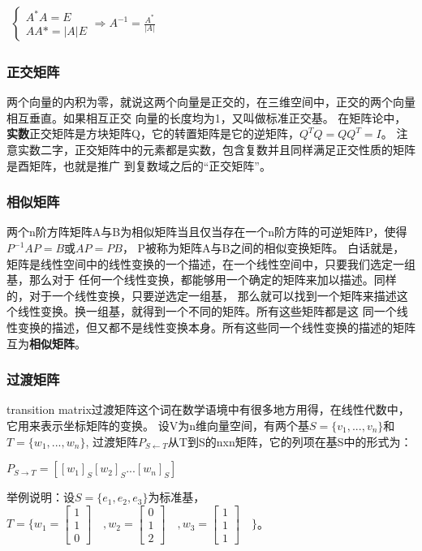 \begin{math}
    \begin{aligned}
\begin{cases} A^*A=E\\ AA*=|A|E \end{cases} \Rightarrow A^{-1}=\frac{A^*}{|A|}
\end{aligned}
\end{math}


\subsubsection{正交矩阵}
两个向量的内积为零，就说这两个向量是正交的，在三维空间中，正交的两个向量相互垂直。如果相互正交
向量的长度均为1，又叫做标准正交基。
在矩阵论中，\textbf{实数}正交矩阵是方块矩阵Q，它的转置矩阵是它的逆矩阵，$Q^TQ=QQ^T=I$。
注意实数二字，正交矩阵中的元素都是实数，包含复数并且同样满足正交性质的矩阵是酉矩阵，也就是推广
到复数域之后的“正交矩阵”。

\subsubsection{相似矩阵}
两个n阶方阵矩阵A与B为相似矩阵当且仅当存在一个n阶方阵的可逆矩阵P，使得$P^{-1}AP=B$或$AP=PB$，
P被称为矩阵A与B之间的相似变换矩阵。
白话就是，矩阵是线性空间中的线性变换的一个描述，在一个线性空间中，只要我们选定一组基，那么对于
任何一个线性变换，都能够用一个确定的矩阵来加以描述。同样的，对于一个线性变换，只要逆选定一组基，
那么就可以找到一个矩阵来描述这个线性变换。换一组基，就得到一个不同的矩阵。所有这些矩阵都是这
同一个线性变换的描述，但又都不是线性变换本身。所有这些同一个线性变换的描述的矩阵互为\textbf{相似矩阵}。

\subsubsection{过渡矩阵}
transition matrix过渡矩阵这个词在数学语境中有很多地方用得，在线性代数中，它用来表示坐标矩阵的变换。
\newline
设V为n维向量空间，有两个基$S=\{v_1,...,v_n\}$和$T=\{w_1,...,w_n\}$,
过渡矩阵$P_{S \leftarrow T}$从T到S的nxn矩阵，它的列项在基S中的形式为：

\begin{math}
    P_{S \rightarrow T} = [[w_1]_S [w_2]_S ... [w_n]_S]
\end{math}

举例说明：设$S=\{ e_1,e_2,e_3\}$为标准基，$T=\{ w_1=\begin{bmatrix} 1\\ 1\\ 0 \end{bmatrix}\quad, w_2=\begin{bmatrix}0\\1\\2\end{bmatrix}\quad 
, w_3=\begin{bmatrix} 1\\1\\1 \end{bmatrix}\quad \}$。

